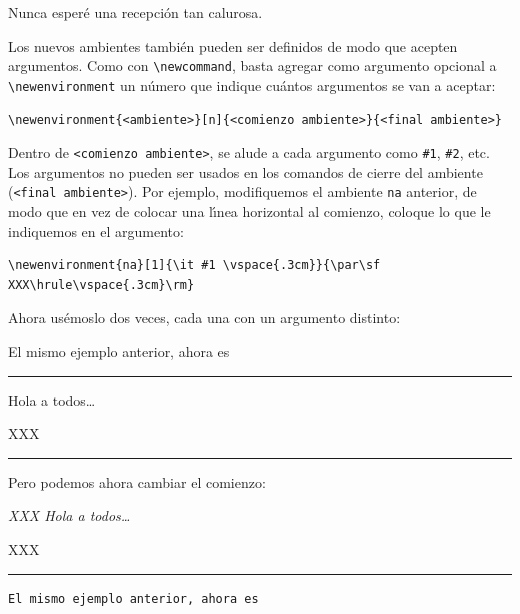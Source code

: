 {{\begin{center}
\begin{minipage}[t]{10cm}
\begin{na}
Nunca esper\'e una recepci\'on tan calurosa.
\end{na}
\end{minipage}
\end{center}
}

Los nuevos ambientes tambi\'en pueden ser definidos de modo que
acepten argumentos. Como con \verb+\newcommand+, basta agregar como
argumento opcional a \verb+\newenvironment+ un n\'umero que indique
cu\'antos argumentos se van a aceptar:

\begin{verbatim}
\newenvironment{<ambiente>}[n]{<comienzo ambiente>}{<final ambiente>}
\end{verbatim}
Dentro de \verb+<comienzo ambiente>+, se alude a cada argumento como
\verb+#1+, \verb+#2+, etc. Los argumentos no pueden ser usados en los
comandos de cierre del ambiente (\verb+<final ambiente>+). Por
ejemplo, modifiquemos el ambiente \verb+na+ anterior, de modo que en
vez de colocar una l\'{\i}nea horizontal al comienzo, coloque lo que
le indiquemos en el argumento:

{\small
\begin{verbatim}
\newenvironment{na}[1]{\it #1 \vspace{.3cm}}{\par\sf XXX\hrule\vspace{.3cm}\rm}
\end{verbatim}
}

Ahora us\'emoslo dos veces, cada una con un argumento distinto:

\vspace{.3cm}
{\small
\begin{minipage}[t]{5cm}
\newenvironment{na}[1]{\it #1 \vspace{.3cm}}{\par\sf XXX\hrule\vspace{.3cm}\rm}
El mismo ejemplo anterior, ahora es

\begin{na}{\hrule}
  Hola a todos\ldots%
%
\end{na}

Pero podemos ahora cambiar el comienzo:

\begin{na}{\it XXX}
  Hola a todos\ldots%
%
\end{na}
\end{minipage}
\hspace{1.5cm}
\begin{minipage}[t]{5cm}
\begin{verbatim}
El mismo ejemplo anterior, ahora es


\end{verbatim}
\end{minipage}}}
